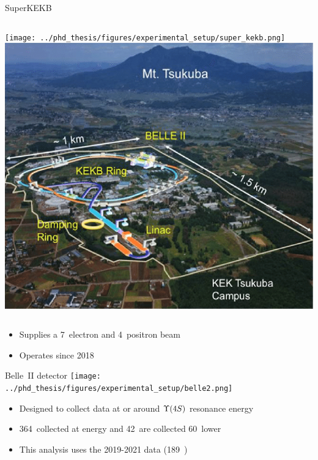 \documentclass[xcolor=dvipsnames]{beamer}
\begin{document}
   \begin{frame}{SuperKEKB}
      \scriptsize\centering
      \begin{columns}
         \texttt{[image: ../phd\_thesis/figures/experimental\_setup/super\_kekb.png]}
         \includegraphics[width=1\textwidth]{figures/Layout-of-SuperKEKB-at-the-KEK-Tsukuba-campus.png}
      \end{columns}
      \begin{itemize}
         \item Supplies a 7~\gev electron and 4~\gev positron beam
         \item Operates since 2018
      \end{itemize}
   \end{frame}

   \begin{frame}{Belle~II detector}
      \scriptsize\centering
      \texttt{[image: ../phd\_thesis/figures/experimental\_setup/belle2.png]}
      \begin{itemize}
         \item Designed to collect data at or around $\FourS$ resonance energy
         \item 364~\invfb collected at \FourS energy and 42~\invfb are collected 60~\mev lower
         \item This analysis uses the 2019-2021 data (189~\invfb)
      \end{itemize}
   \end{frame}
\end{document}
